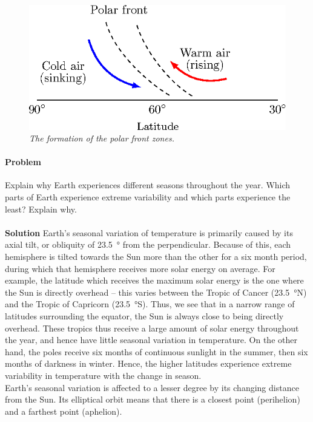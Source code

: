 \documentclass[10pt]{article}
\newcounter{prob}
\def\problem{\stepcounter{prob}\paragraph{Problem \arabic{prob}}}
\def\solution{\\\\\textbf{Solution }}
\begin{document}
        \begin{figure}[h!]
        \begin{center}
                \includegraphics{./polar_front.eps}
        \end{center}
        \caption*{\it The formation of the polar front zones.}
        \label{fig:polar_front}
        \end{figure}
        

        \problem Explain why Earth experiences different seasons throughout the year.
        Which parts of Earth experience extreme variability and which parts experience the least? Explain why.
        \solution Earth's seasonal variation of temperature is primarily caused by its axial tilt, or obliquity of \SI{23.5}{\degree} from the
        perpendicular. Because of this, each hemisphere is tilted towards the Sun more than the other for a six month period, during which
        that hemisphere receives more solar energy on average. For example, the latitude which receives the maximum solar energy is the one
        where the Sun is directly overhead -- this varies between the Tropic of Cancer (\SI{23.5}{\degree}N) and the Tropic of
        Capricorn (\SI{23.5}{\degree}S). Thus, we see that in a narrow range of latitudes surrounding the equator, the Sun is always close to being
        directly overhead. These tropics thus receive a large amount of solar energy throughout the year, and hence have little seasonal
        variation in temperature. On the other hand, the poles receive six months of continuous sunlight in the summer, then six months of darkness in
        winter. Hence, the higher latitudes experience extreme variability in temperature with the change in season.\\

        Earth's seasonal variation is affected to a lesser degree by its changing distance from the Sun. Its elliptical orbit means that
        there is a closest point (perihelion) and a farthest point (aphelion).\\
\end{document}
